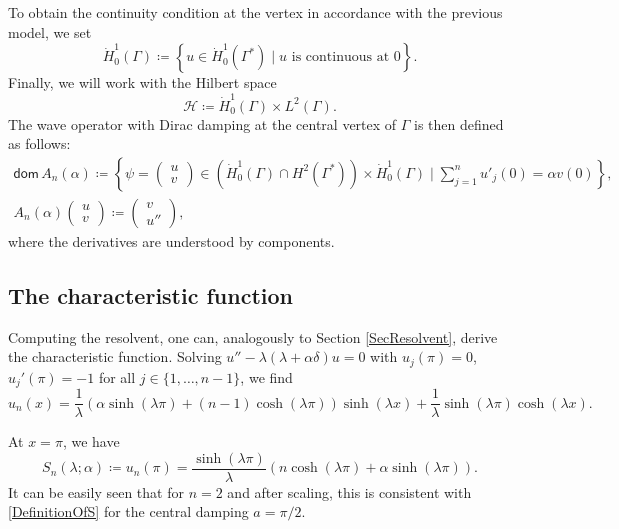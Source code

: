 \documentclass[11pt, a4paper,reqno]{amsart}
\theoremstyle{plain}
\theoremstyle{definition}
\theoremstyle{remark}
\newcommand{\1}{\mathds 1}
\newcommand{\Dom}{\mathsf{dom}\,}
\begin{document}
To obtain the continuity condition at the vertex in accordance with the previous model, we set
\[
\dot H_0^1(\Gamma) \coloneqq \left\{u \in \dot H_0^1(\Gamma^\ast) \mid u \text{ is continuous at } 0\right\}.
\]
Finally, we will work with the Hilbert space
\[
\mathcal H \coloneqq \dot H_0^1(\Gamma) \times L^2(\Gamma).
\]
The wave operator with Dirac damping at the central vertex of $\Gamma$ is then defined as follows:
\begin{gather*}
\Dom A_n(\alpha) \coloneqq \left\{\psi = \begin{pmatrix}
    u \\ v
\end{pmatrix} \in \left(\dot H_0^1(\Gamma) \cap H^2(\Gamma^\ast)\right) \times \dot H_0^1(\Gamma) \mid \sum_{j=1}^n u'_j(0) = \alpha v(0) \right\}, \\
A_n(\alpha)\begin{pmatrix}
    u \\ v
\end{pmatrix} \coloneqq \begin{pmatrix}
    v \\ u''
\end{pmatrix},
\end{gather*}
where the derivatives are understood by components.

\subsection{The characteristic function}
Computing the resolvent, one can, analogously to Section \ref{SecResolvent}, derive the characteristic function. Solving $u'' - \lambda(\lambda + \alpha\delta)u = 0$ with $u_j(\pi) = 0$, $u_j'(\pi) = -1$ for all $j \in \{1, \dots, n-1\}$, we find
\[
u_n(x) = \frac{1}{\lambda}\left(\alpha\sinh(\lambda\pi) + (n-1) \cosh(\lambda\pi)\right)\sinh(\lambda x) + \frac{1}{\lambda}\sinh(\lambda\pi)\cosh(\lambda x).
\]

At $x = \pi$, we have
\begin{equation}
S_n(\lambda;\alpha) \coloneqq u_n(\pi)
= \frac{\sinh(\lambda\pi)}{\lambda}\left(n\cosh(\lambda\pi) + \alpha \sinh(\lambda\pi)\right).    \label{GraphCharacteristicFunction}
\end{equation}
It can be easily seen that for $n=2$ and after scaling, this is consistent with \eqref{DefinitionOfS} for the central damping $a = \pi/2$.


\end{document}
